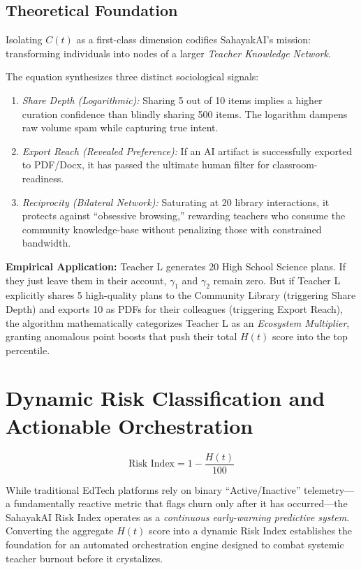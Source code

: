 \documentclass[11pt,a4paper]{article}
\begin{document}
\subsection{Theoretical Foundation}
Isolating $C(t)$ as a first-class dimension codifies SahayakAI's mission: transforming individuals into nodes of a larger \textit{Teacher Knowledge Network}. 

The equation synthesizes three distinct sociological signals:
\begin{enumerate}
    \item \textit{Share Depth (Logarithmic):} Sharing 5 out of 10 items implies a higher curation confidence than blindly sharing 500 items. The logarithm dampens raw volume spam while capturing true intent.
    \item \textit{Export Reach (Revealed Preference):} If an AI artifact is successfully exported to PDF/Docx, it has passed the ultimate human filter for classroom-readiness.
    \item \textit{Reciprocity (Bilateral Network):} Saturating at 20 library interactions, it protects against ``obsessive browsing,'' rewarding teachers who consume the community knowledge-base without penalizing those with constrained bandwidth.
\end{enumerate}

\textbf{Empirical Application:}
Teacher L generates 20 High School Science plans. If they just leave them in their account, $\gamma_1$ and $\gamma_2$ remain zero. But if Teacher L explicitly shares 5 high-quality plans to the Community Library (triggering Share Depth) and exports 10 as PDFs for their colleagues (triggering Export Reach), the algorithm mathematically categorizes Teacher L as an \textit{Ecosystem Multiplier}, granting anomalous point boosts that push their total $H(t)$ score into the top percentile.

\section{Dynamic Risk Classification and Actionable Orchestration}

\begin{equation}
    \text{Risk Index} = 1 - \frac{H(t)}{100}
\end{equation}

While traditional EdTech platforms rely on binary ``Active/Inactive'' telemetry---a fundamentally reactive metric that flags churn only after it has occurred---the SahayakAI Risk Index operates as a \textit{continuous early-warning predictive system}. Converting the aggregate $H(t)$ score into a dynamic Risk Index establishes the foundation for an automated orchestration engine designed to combat systemic teacher burnout before it crystalizes.
\end{document}

